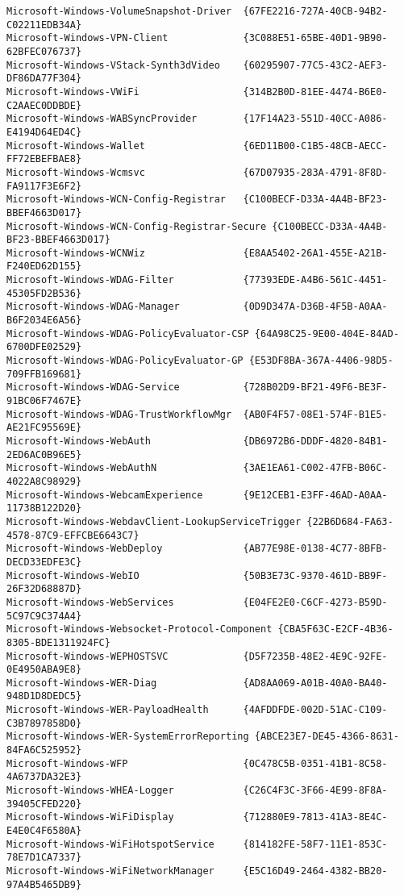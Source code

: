 \documentclass{report}
\begin{document}
\begin{lstlisting}[breaklines=true,basicstyle=\tiny]
Microsoft-Windows-VolumeSnapshot-Driver  {67FE2216-727A-40CB-94B2-C02211EDB34A}
Microsoft-Windows-VPN-Client             {3C088E51-65BE-40D1-9B90-62BFEC076737}
Microsoft-Windows-VStack-Synth3dVideo    {60295907-77C5-43C2-AEF3-DF86DA77F304}
Microsoft-Windows-VWiFi                  {314B2B0D-81EE-4474-B6E0-C2AAEC0DDBDE}
Microsoft-Windows-WABSyncProvider        {17F14A23-551D-40CC-A086-E4194D64ED4C}
Microsoft-Windows-Wallet                 {6ED11B00-C1B5-48CB-AECC-FF72EBEFBAE8}
Microsoft-Windows-Wcmsvc                 {67D07935-283A-4791-8F8D-FA9117F3E6F2}
Microsoft-Windows-WCN-Config-Registrar   {C100BECF-D33A-4A4B-BF23-BBEF4663D017}
Microsoft-Windows-WCN-Config-Registrar-Secure {C100BECC-D33A-4A4B-BF23-BBEF4663D017}
Microsoft-Windows-WCNWiz                 {E8AA5402-26A1-455E-A21B-F240ED62D155}
Microsoft-Windows-WDAG-Filter            {77393EDE-A4B6-561C-4451-45305FD2B536}
Microsoft-Windows-WDAG-Manager           {0D9D347A-D36B-4F5B-A0AA-B6F2034E6A56}
Microsoft-Windows-WDAG-PolicyEvaluator-CSP {64A98C25-9E00-404E-84AD-6700DFE02529}
Microsoft-Windows-WDAG-PolicyEvaluator-GP {E53DF8BA-367A-4406-98D5-709FFB169681}
Microsoft-Windows-WDAG-Service           {728B02D9-BF21-49F6-BE3F-91BC06F7467E}
Microsoft-Windows-WDAG-TrustWorkflowMgr  {AB0F4F57-08E1-574F-B1E5-AE21FC95569E}
Microsoft-Windows-WebAuth                {DB6972B6-DDDF-4820-84B1-2ED6AC0B96E5}
Microsoft-Windows-WebAuthN               {3AE1EA61-C002-47FB-B06C-4022A8C98929}
Microsoft-Windows-WebcamExperience       {9E12CEB1-E3FF-46AD-A0AA-11738B122D20}
Microsoft-Windows-WebdavClient-LookupServiceTrigger {22B6D684-FA63-4578-87C9-EFFCBE6643C7}
Microsoft-Windows-WebDeploy              {AB77E98E-0138-4C77-8BFB-DECD33EDFE3C}
Microsoft-Windows-WebIO                  {50B3E73C-9370-461D-BB9F-26F32D68887D}
Microsoft-Windows-WebServices            {E04FE2E0-C6CF-4273-B59D-5C97C9C374A4}
Microsoft-Windows-Websocket-Protocol-Component {CBA5F63C-E2CF-4B36-8305-BDE1311924FC}
Microsoft-Windows-WEPHOSTSVC             {D5F7235B-48E2-4E9C-92FE-0E4950ABA9E8}
Microsoft-Windows-WER-Diag               {AD8AA069-A01B-40A0-BA40-948D1D8DEDC5}
Microsoft-Windows-WER-PayloadHealth      {4AFDDFDE-002D-51AC-C109-C3B7897858D0}
Microsoft-Windows-WER-SystemErrorReporting {ABCE23E7-DE45-4366-8631-84FA6C525952}
Microsoft-Windows-WFP                    {0C478C5B-0351-41B1-8C58-4A6737DA32E3}
Microsoft-Windows-WHEA-Logger            {C26C4F3C-3F66-4E99-8F8A-39405CFED220}
Microsoft-Windows-WiFiDisplay            {712880E9-7813-41A3-8E4C-E4E0C4F6580A}
Microsoft-Windows-WiFiHotspotService     {814182FE-58F7-11E1-853C-78E7D1CA7337}
Microsoft-Windows-WiFiNetworkManager     {E5C16D49-2464-4382-BB20-97A4B5465DB9}

\end{lstlisting}
\end{document}
